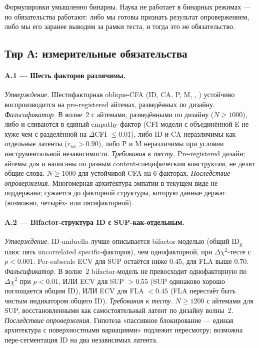 Формулировки умышленно бинарны. Наука не работает в бинарных режимах --- но обязательства работают: либо мы готовы признать результат опровержением, либо мы его заранее выводим за рамки теста, и тогда это не обязательство.

\subsection{Тир А: измерительные обязательства}
\label{subsec:falsification_tier_a}

\paragraph{A.1 --- Шесть факторов различимы.}
\emph{Утверждение.} Шестифакторная oblique-CFA (ID, CA, P, M, \EAF{}, \Ecog{}) устойчиво воспроизводится на pre-registered айтемах, разведённых по дизайну.
\emph{Фальсификатор.} В волне~2 с айтемами, разведёнными по дизайну ($N \geq 1000$), либо \EAF{} и \Ecog{} сливаются в единый empathy-фактор (CFI модели с объединённой E не хуже чем с разделённой на $\Delta$CFI $\leq 0.01$), либо ID и CA неразличимы как отдельные латенты ($r_{\mathrm{lat}} > 0.90$), либо P и M неразличимы при условии инструментальной независимости.
\emph{Требования к тесту.} Pre-registered дизайн; айтемы для \EAF{} и \Ecog{} написаны по разным content-специфическим конструктам, не делят общие слова. $N \geq 1000$ для устойчивой CFA на 6 факторах.
\emph{Последствие опровержения.} Многомерная архитектура эмпатии в текущем виде не поддержана; \DEIC{} сужается до факторной структуры, которую данные держат (возможно, четырёх- или пятифакторной).

\paragraph{A.2 --- Bifactor-структура ID с SUP-как-отдельным.}
\emph{Утверждение.} ID-umbrella лучше описывается bifactor-моделью (общий ID$_{\mathrm{g}}$ плюс пять uncorrelated specific-факторов), чем однофакторной, при $\Delta\chi^2$-тесте с $p < 0.001$. Per-subscale ECV для SUP остаётся ниже $0.45$, для FLA выше $0.70$.
\emph{Фальсификатор.} В волне~2 bifactor-модель не превосходит однофакторную по $\Delta\chi^2$ при $p < 0.01$, ИЛИ ECV для SUP $> 0.55$ (SUP одинаково хорошо поглощается общим ID), ИЛИ ECV для FLA $< 0.45$ (FLA перестаёт быть чистым индикатором общего ID).
\emph{Требования к тесту.} $N \geq 1200$ с айтемами для SUP, восстановленными как самостоятельный латент по дизайну волны~2.
\emph{Последствие опровержения.} Гипотеза «пассивное блокирование --- единая архитектура с поверхностными вариациями» подлежит пересмотру; возможна пере-сегментация ID на два независимых латента.

